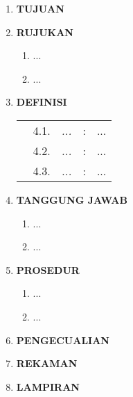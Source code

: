 \documentclass[12pt]{cl.doc}
\begin{document}
    \newpage

    \begin{enumerate}
        \item \textbf{TUJUAN}\\\vspace{1ex}

        \item \textbf{RUJUKAN}
            \begin{enumerate}
                \item ...
                \item ...
            \end{enumerate}

        \item \textbf{DEFINISI}
            \begin{longtable}{p{8pt} r p{3cm} c p{10.98cm}}
                & 4.1. & \textit{...} & : & ...\\
                & 4.2. & \textit{...} & : & ...\\
                & 4.3. & \textit{...} & : & ...\\
            \end{longtable}

        \item \textbf{TANGGUNG JAWAB}
            \begin{enumerate}
                \item ...
                \item ...
            \end{enumerate}

        \item \textbf{PROSEDUR}
            \begin{enumerate}
                \item ...
                \item ...
            \end{enumerate}

        \item \textbf{PENGECUALIAN}
        \item \textbf{REKAMAN}
        \item \textbf{LAMPIRAN}
    \end{enumerate}
\end{document}
